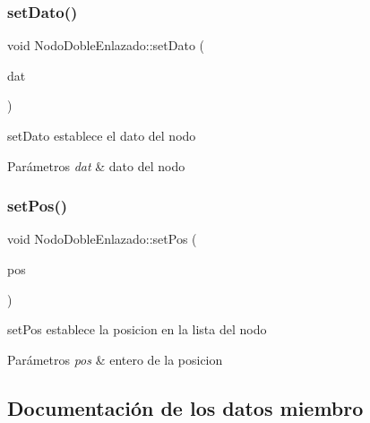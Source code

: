 \subsubsection{\texorpdfstring{set\+Dato()}{setDato()}}
{\footnotesize\ttfamily void Nodo\+Doble\+Enlazado\+::set\+Dato (\begin{DoxyParamCaption}\item[{Q\+String}]{dat }\end{DoxyParamCaption})\hspace{0.3cm}{\ttfamily [inline]}}



set\+Dato establece el dato del nodo 


\begin{DoxyParams}{Parámetros}
{\em dat} & dato del nodo \\
\hline
\end{DoxyParams}
\mbox{\label{class_nodo_doble_enlazado_ae8fa0f3b992875c1031e49eabba670a8}} 
\subsubsection{\texorpdfstring{set\+Pos()}{setPos()}}
{\footnotesize\ttfamily void Nodo\+Doble\+Enlazado\+::set\+Pos (\begin{DoxyParamCaption}\item[{int}]{pos }\end{DoxyParamCaption})\hspace{0.3cm}{\ttfamily [inline]}}



set\+Pos establece la posicion en la lista del nodo 


\begin{DoxyParams}{Parámetros}
{\em pos} & entero de la posicion \\
\hline
\end{DoxyParams}


\subsection{Documentación de los datos miembro}
\mbox{\label{class_nodo_doble_enlazado_aec27165ad44ca05a20a4c80f93db9c96}} 

